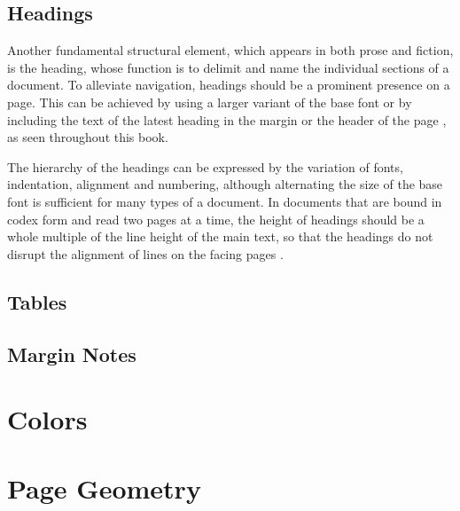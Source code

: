 \subsection{Headings}
Another fundamental structural element, which appears in both prose and fiction,
is the heading, whose function is to delimit and name the individual sections of
a document. To alleviate navigation, headings should be a prominent presence on
a page. This can be achieved by using a larger variant of the base font or by
including the text of the latest heading in the margin or the header of the page
\cite[sec.\,4.2.1]{bringhurst92}, as seen throughout this book.

The hierarchy of the headings can be expressed by the variation of fonts,
indentation, alignment and numbering, although alternating the size of the base
font is sufficient for many types of a document. In documents that are bound in
codex form and read two pages at a time, the height of headings should be a
whole multiple of the line height of the main text, so that the headings do not
disrupt the alignment of lines on the facing pages \cite[para.\,33]{kapr99}.


\subsection{Tables}
\subsection{Margin Notes}

\section{Colors}
\section{Page Geometry}
